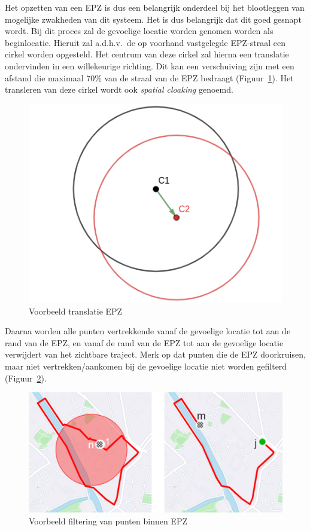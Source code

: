 Het opzetten van een EPZ is dus een belangrijk onderdeel bij het blootleggen
van mogelijke zwakheden van dit systeem. Het is dus belangrijk dat dit goed
gesnapt wordt. Bij dit proces zal de gevoelige locatie worden genomen worden
als beginlocatie. Hieruit zal a.d.h.v.\ de op voorhand vastgelegde EPZ-straal
een cirkel worden opgesteld. Het centrum van deze cirkel zal hierna een
translatie ondervinden in een willekeurige richting. Dit kan een verschuiving
zijn met een afstand die maximaal 70\% van de straal van de EPZ bedraagt
(Figuur~\ref{fig:translation}). Het transleren van deze cirkel wordt ook
\textit{spatial cloaking} genoemd.
\begin{figure}[h]
    \centering
    \includegraphics[width=0.4\linewidth]{fig/EPZ-mechanisme/Translation_Center.png}
    \caption{Voorbeeld translatie EPZ}\label{fig:translation}
\end{figure}

Daarna worden alle punten vertrekkende vanaf de gevoelige locatie tot aan de
rand van de EPZ, en vanaf de rand van de EPZ tot aan de gevoelige locatie
verwijdert van het zichtbare traject. Merk op dat punten die de EPZ
doorkruisen, maar niet vertrekken/aankomen bij de gevoelige locatie niet worden
gefilterd (Figuur~\ref{fig:drop points}).
\begin{figure}[h]
    \centering
    \includegraphics[width=0.7\linewidth]{fig/EPZ-mechanisme/DropEPZPoints.png}
    \caption{Voorbeeld filtering van punten binnen EPZ}\label{fig:drop points}
\end{figure}


